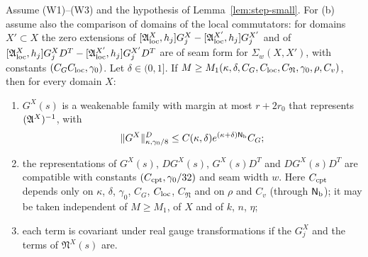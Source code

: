\begin{theorem}\label{thm:weak-inverse}
Assume (W1)--(W3) and the hypothesis of Lemma~\ref{lem:step-small}. For (b) assume also the comparison of domains of the local commutators: for domains $X'\subset X$ the zero extensions of $[\mathfrak A^X_{\rm loc},h_j]G^X_j-[\mathfrak A^{X'}_{\rm loc},h_j]G^{X'}_j$ and of $[\mathfrak A^X_{\rm loc},h_j]G^X_jD^T-[\mathfrak A^{X'}_{\rm loc},h_j]G^{X'}_jD^T$ are of seam form for $\Sigma_w(X,X')$, with constants $(C_GC_{\rm loc},\gamma_0)$. Let $\delta\in(0,1]$. If $M\ge M_1(\kappa,\delta,C_G,C_{\rm loc},C_{\mathfrak N},\gamma_0,\rho,C_v)$, then for every domain $X$:
\begin{enumerate}[label=(\alph*)]
\item $G^X(s)$ is a weakenable family with margin at most $r+2r_0$ that represents $(\mathfrak A^X)^{-1}$, with
\[
\|G^X\|^D_{\kappa,\gamma_0/8}\le C(\kappa,\delta)e^{(\kappa+\delta)\mathsf N_{\rm b}}C_G ;
\]
\item the representations of $G^X(s)$, $DG^X(s)$, $G^X(s)D^T$ and $DG^X(s)D^T$ are compatible with constants $(C_{\rm cpt},\gamma_0/32)$ and seam width $w$. Here $C_{\rm cpt}$ depends only on $\kappa$, $\delta$, $\gamma_0$, $C_G$, $C_{\rm loc}$, $C_{\mathfrak N}$ and on $\rho$ and $C_v$ (through $\mathsf N_{\rm b}$); it may be taken independent of $M\ge M_1$, of $X$ and of $k$, $n$, $\eta$;
\item each term is covariant under real gauge transformations if the $G^X_j$ and the terms of $\mathfrak N^X(s)$ are.
\end{enumerate}
\end{theorem}

